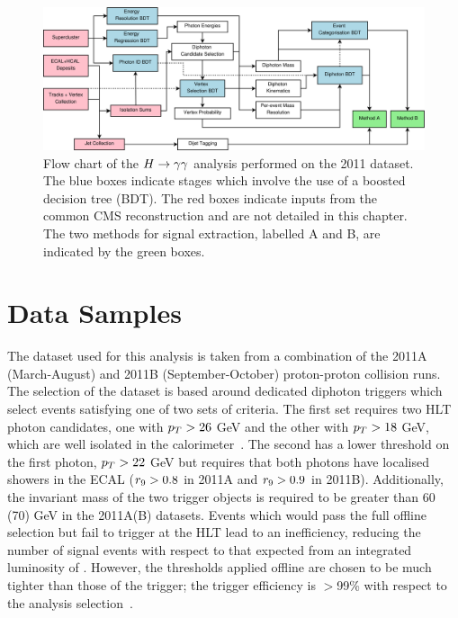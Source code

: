 \begin{figure}
\includegraphics[width=\textwidth]{hgg7TeV/generalPlots/mvaflowchart.pdf}
\caption{Flow chart of the $H\rightarrow\gamma\gamma$ analysis performed on the 2011 dataset. The blue boxes
 indicate stages which involve the use of a boosted decision tree (BDT). The red boxes indicate 
inputs from the common CMS reconstruction and are not detailed in this chapter. The two 
methods for signal extraction, labelled A and B, are indicated by the green boxes.}
\label{fig:mvaoverview}
\end{figure}

\section{Data Samples}
\label{sec:datasamples}

The dataset used for this analysis is taken from a combination of the 2011A 
(March-August) and 2011B (September-October) proton-proton collision runs.
The selection of the dataset is based around dedicated diphoton triggers
which select events satisfying one of two sets of criteria.
The first set requires two HLT photon candidates, one with $p_{T}>26$ GeV and the other with 
$p_{T}>18$ GeV, which are well isolated in the calorimeter~\citep{AN-12-048}. The second has a lower threshold on
the first photon, $p_{T}>22$ GeV but requires that both photons have localised showers in the ECAL 
($r_{9}>0.8$ in 2011A and $r_{9}>0.9$ in 2011B). 
Additionally, the invariant mass of the two trigger objects is required to be 
greater than 60 (70) GeV in the 2011A(B) datasets.
Events which would pass the full offline selection but fail to trigger at the HLT lead to an inefficiency, 
reducing the number of signal events with respect to that expected from an integrated luminosity of \clumi.
However, the thresholds applied offline are chosen to be much tighter than those of the trigger;
the trigger efficiency is $>$99\% with respect to the analysis selection~\citep{AN-12-048}. 

